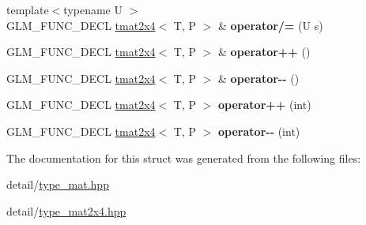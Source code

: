 \begin{DoxyCompactItemize}
\item 
\hypertarget{structglm_1_1tmat2x4_aa979764dc4e9915169cec5dd81b55b31}{{\footnotesize template$<$typename U $>$ }\\G\-L\-M\-\_\-\-F\-U\-N\-C\-\_\-\-D\-E\-C\-L \hyperlink{structglm_1_1tmat2x4}{tmat2x4}$<$ T, P $>$ \& {\bfseries operator/=} (U s)}\label{structglm_1_1tmat2x4_aa979764dc4e9915169cec5dd81b55b31}

\item 
\hypertarget{structglm_1_1tmat2x4_a0c6a0b2ecfc133968bca3b6eb3222da7}{G\-L\-M\-\_\-\-F\-U\-N\-C\-\_\-\-D\-E\-C\-L \hyperlink{structglm_1_1tmat2x4}{tmat2x4}$<$ T, P $>$ \& {\bfseries operator++} ()}\label{structglm_1_1tmat2x4_a0c6a0b2ecfc133968bca3b6eb3222da7}

\item 
\hypertarget{structglm_1_1tmat2x4_aca74bbf40a2986b7717420fbbe95c447}{G\-L\-M\-\_\-\-F\-U\-N\-C\-\_\-\-D\-E\-C\-L \hyperlink{structglm_1_1tmat2x4}{tmat2x4}$<$ T, P $>$ \& {\bfseries operator-\/-\/} ()}\label{structglm_1_1tmat2x4_aca74bbf40a2986b7717420fbbe95c447}

\item 
\hypertarget{structglm_1_1tmat2x4_a3bfa0ca51b168bd10549d809065e2e26}{G\-L\-M\-\_\-\-F\-U\-N\-C\-\_\-\-D\-E\-C\-L \hyperlink{structglm_1_1tmat2x4}{tmat2x4}$<$ T, P $>$ {\bfseries operator++} (int)}\label{structglm_1_1tmat2x4_a3bfa0ca51b168bd10549d809065e2e26}

\item 
\hypertarget{structglm_1_1tmat2x4_a2df54cb6c50a0c06526a4275c84c4238}{G\-L\-M\-\_\-\-F\-U\-N\-C\-\_\-\-D\-E\-C\-L \hyperlink{structglm_1_1tmat2x4}{tmat2x4}$<$ T, P $>$ {\bfseries operator-\/-\/} (int)}\label{structglm_1_1tmat2x4_a2df54cb6c50a0c06526a4275c84c4238}

\end{DoxyCompactItemize}


The documentation for this struct was generated from the following files\-:\begin{DoxyCompactItemize}
\item 
detail/\hyperlink{type__mat_8hpp}{type\-\_\-mat.\-hpp}\item 
detail/\hyperlink{type__mat2x4_8hpp}{type\-\_\-mat2x4.\-hpp}\end{DoxyCompactItemize}
